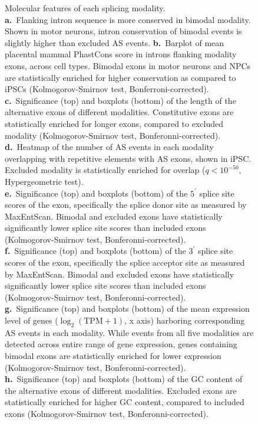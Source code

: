 \clearpage
\thispagestyle{facingcaption}
\begin{figure}[h]
\captionsetup{labelformat=prev-page}
\caption[Molecular features of each splicing modality.]{
Molecular features of each splicing modality.\\
\textbf{a.}~Flanking intron sequence is more conserved in  bimodal modality. Shown in motor neurons,  intron conservation of bimodal events is slightly higher than excluded AS events.
\textbf{b.}~Barplot of mean placental mammal PhastCons score in introns flanking modality exons, across cell types. Bimodal exons in motor neurons  and NPCs are statistically enriched for higher conservation as compared to iPSCs (Kolmogorov-Smirnov test, Bonferroni-corrected).\\
\textbf{c.}~Significance (top) and boxplots (bottom) of the length of the alternative exons of different modalities. Constitutive exons are statistically enriched for longer exons, compared to excluded modality (Kolmogorov-Smirnov test, Bonferonni-corrected).\\
\textbf{d.}~Heatmap of the number of AS events in each modality overlapping with repetitive elements with AS exons, shown in iPSC. Excluded modality is statistically enriched for overlap ($q < 10^{-50}$, Hypergeometric test).\\
\textbf{e.}~Significance (top) and boxplots (bottom) of the $5^\prime$ splice site scores of the exon, specifically the splice donor site as measured by MaxEntScan. Bimodal and excluded exons have statistically significantly lower splice site scores than included exons (Kolmogorov-Smirnov test, Bonferonni-corrected).\\
\textbf{f.}~Significance (top) and boxplots (bottom) of the $3^\prime$ splice site scores of the exon, specifically the splice acceptor site as measured by MaxEntScan. Bimodal and excluded exons have statistically significantly lower splice site scores than included exons (Kolmogorov-Smirnov test, Bonferonni-corrected).\\
\textbf{g.}~Significance (top) and boxplots (bottom) of the mean expression level of genes ($\log_2(\mathrm{TPM}+1)$, x axis) harboring corresponding AS events in each modality. While events from all five modalities are detected across entire range of gene expression, genes containing bimodal exons are statistically enriched for lower expression (Kolmogorov-Smirnov test, Bonferonni-corrected).\\
\textbf{h.}~Significance (top) and boxplots (bottom) of the GC content of the alternative exons of different modalities. Excluded exons are statistically enriched for higher GC content, compared to included exons (Kolmogorov-Smirnov test, Bonferonni-corrected).\\
}
\end{figure}
